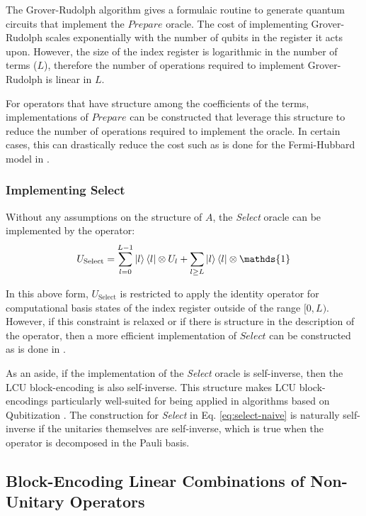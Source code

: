 The Grover-Rudolph algorithm \cite{grover2002creating} gives a formulaic routine to generate quantum circuits that implement the $\textit{Prepare}$ oracle.
The cost of implementing Grover-Rudolph scales exponentially with the number of qubits in the register it acts upon.
However, the size of the index register is logarithmic in the number of terms ($L$), therefore the number of operations required to implement Grover-Rudolph is linear in $L$.

For operators that have structure among the coefficients of the terms, implementations of $\textit{Prepare}$ can be constructed that leverage this structure to reduce the number of operations required to implement the oracle.
In certain cases, this can drastically reduce the cost such as is done for the Fermi-Hubbard model in \cite{babbush2018encoding}.

\subsubsection{Implementing \textbf{Select}}

Without any assumptions on the structure of $A$, the \textit{Select} oracle can be implemented by the operator:
\begin{equation}
    \label{eq:select-naive}
    U_\text{Select} = \sum_{l=0}^{L-1} \ket{l}\bra{l} \otimes U_l + \sum_{l \geq L} \ket{l}\bra{l} \otimes \mathds{1}
\end{equation}

In this above form, $U_\text{Select}$ is restricted to apply the identity operator for computational basis states of the index register outside of the range $[0, L)$.
However, if this constraint is relaxed or if there is structure in the description of the operator, then a more efficient implementation of $\textit{Select}$ can be constructed as is done in \cite{babbush2018encoding}.  

As an aside, if the implementation of the \textit{Select} oracle is self-inverse, then the LCU block-encoding is also self-inverse.
This structure makes LCU block-encodings particularly well-suited for being applied in algorithms based on Qubitization \cite{low2019hamiltonian}.
The construction for \textit{Select} in Eq. \ref{eq:select-naive} is naturally self-inverse if the unitaries themselves are self-inverse, which is true when the operator is decomposed in the Pauli basis.

\subsection{Block-Encoding Linear Combinations of Non-Unitary Operators}
\label{subsec:lco}

